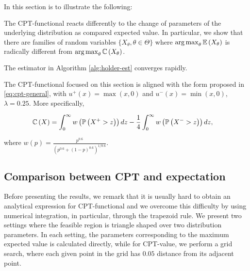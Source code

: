 In this section is to illustrate the following: \\
\begin{inparaenum}[\bfseries (i)]
\item The CPT-functional reacts differently to the change of parameters of the underlying distribution as compared expected value. In particular, we show that there are families of random variables $\{X_\theta, \theta \in \Theta\}$ where $\mathop{\rm arg\,max}_{\theta} \mathbb{E}\left( X_\theta \right)$ is radically different from 
$\mathop{\rm arg\,max}_{\theta} \mathbb{C} \left( X_\theta \right)$. \\
\item The estimator in Algorithm \ref{alg:holder-est} converges rapidly.
\end{inparaenum}

The CPT-functional focused on this section is aligned with the form proposed in \eqref{eq:cpt-general}, with $u^+(x) = \max(x,0)$ and 
$u^-(x) = \min(x,0)$, $\lambda = 0.25$. 
More specifically,
\begin{small}
\begin{align*}
\mathbb{C}\left(X\right) &= \int_0^{\infty} w\left(\mathbb{P}\left( X^+>z \right)\right) dz - \frac{1}{4} \int_0^{\infty} w\left(\mathbb{P}\left( X^->z \right)\right) dz, 
\end{align*}
\end{small}
where $w(p) = \frac{p^{0.6}}{(p^{0.6} + (1-p)^{0.6})^{1/0.6}}.$ 

\subsection{Comparison between CPT and expectation}
Before presenting the results, we remark that it is usually hard to obtain an analytical expression for CPT-functional and we overcome this difficulty by using numerical integration, in particular, through the trapezoid rule. 
We present two settings where the feasible region is triangle shaped over two distribution parameters. In each setting, the parameters corresponding to the maximum expected value is calculated directly, while for CPT-value, we perform a grid search, where each given point in the grid has $0.05$ distance from its adjacent point. 



